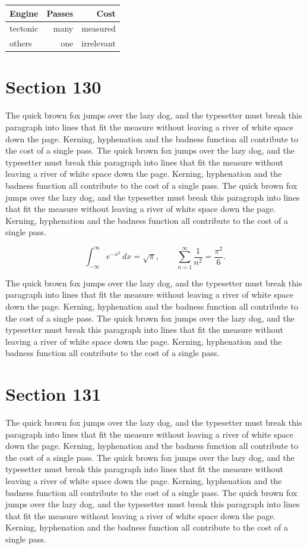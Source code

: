 \documentclass{article}
\begin{document}
\begin{center}
\begin{tabular}{lrr}
\toprule
Engine & Passes & Cost \\
\midrule
tectonic & many & measured \\
others & one & irrelevant \\
\bottomrule
\end{tabular}
\end{center}

\section{Section 130}
The quick brown fox jumps over the lazy dog, and the typesetter must break this paragraph into lines that fit the measure without leaving a river of white space down the page. Kerning, hyphenation and the badness function all contribute to the cost of a single pass. The quick brown fox jumps over the lazy dog, and the typesetter must break this paragraph into lines that fit the measure without leaving a river of white space down the page. Kerning, hyphenation and the badness function all contribute to the cost of a single pass. The quick brown fox jumps over the lazy dog, and the typesetter must break this paragraph into lines that fit the measure without leaving a river of white space down the page. Kerning, hyphenation and the badness function all contribute to the cost of a single pass. 

\begin{equation}
\int_{-\infty}^{\infty} e^{-x^{2}}\,dx = \sqrt{\pi}, \qquad
\sum_{n=1}^{\infty} \frac{1}{n^{2}} = \frac{\pi^{2}}{6}.
\end{equation}

The quick brown fox jumps over the lazy dog, and the typesetter must break this paragraph into lines that fit the measure without leaving a river of white space down the page. Kerning, hyphenation and the badness function all contribute to the cost of a single pass. The quick brown fox jumps over the lazy dog, and the typesetter must break this paragraph into lines that fit the measure without leaving a river of white space down the page. Kerning, hyphenation and the badness function all contribute to the cost of a single pass. 
\section{Section 131}
The quick brown fox jumps over the lazy dog, and the typesetter must break this paragraph into lines that fit the measure without leaving a river of white space down the page. Kerning, hyphenation and the badness function all contribute to the cost of a single pass. The quick brown fox jumps over the lazy dog, and the typesetter must break this paragraph into lines that fit the measure without leaving a river of white space down the page. Kerning, hyphenation and the badness function all contribute to the cost of a single pass. The quick brown fox jumps over the lazy dog, and the typesetter must break this paragraph into lines that fit the measure without leaving a river of white space down the page. Kerning, hyphenation and the badness function all contribute to the cost of a single pass. 
\end{document}
